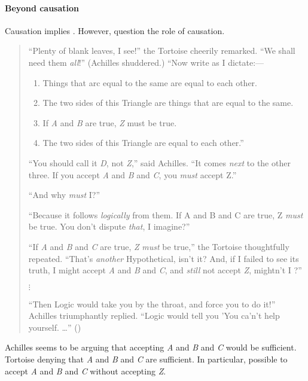 \paragraph{Beyond causation}
\label{sec:motivating-ESU:beyond-causation}

\begin{note}
  Causation implies \ESU{}.
  However, question the role of causation.
\end{note}

\begin{note}
  \begin{quote}
    ``Plenty of blank leaves, I see!'' the Tortoise cheerily remarked.
    ``We shall need them \emph{all}!''
    (Achilles shuddered.)
    ``Now write as I dictate:---

    \begin{enumerate}[label=(\emph{\Alph*})]
    \item Things that arc equal to the same are equal to each other.
    \item The two sides of this Triangle are things that are equal to the same.
    \item If \emph{A} and \emph{B} are true, \emph{Z} must be true.
      \setcounter{enumi}{25}
    \item The two sides of this Triangle are equal to each other.''
    \end{enumerate}

    ``You should call it \emph{D}, not \emph{Z},'' said Achilles.
    ``It comes \emph{next} to the other three.
    If you accept \emph{A} and \emph{B} and \emph{C}, you \emph{must} accept Z.''

    ``And why \emph{must} I?''

    ``Because it follows \emph{logically} from them.
    If A and B and C are true, Z \emph{must} be true.
    You don't dispute \emph{that}, I imagine?''

    ``If \emph{A} and \emph{B} and \emph{C} are true, \emph{Z} \emph{must} be true,'' the Tortoise thoughtfully repeated.
    ``That's \emph{another} Hypothetical, isn't it?
    And, if I failed to see its truth, I might accept \emph{A} and \emph{B} and \emph{C}, and \emph{still} not accept \emph{Z}, mightn't I ?''

    \mbox{}\hfill\(\vdots\)\hfill\mbox{}

    ``Then Logic would take you by the throat, and force you to do it!''
    Achilles triumphantly replied. ``Logic would tell you 'You ca'n't help yourself.
    \dots''\nolinebreak
    \mbox{}\hfill\mbox{(\Citeyear[279--280]{Carroll:1895uj})}
  \end{quote}
  Achilles seems to be arguing that accepting \emph{A} and \emph{B} and \emph{C} would be sufficient.
  Tortoise denying that \emph{A} and \emph{B} and \emph{C} are sufficient.
  In particular, possible to accept \emph{A} and \emph{B} and \emph{C} without accepting \emph{Z}.


\end{note}
